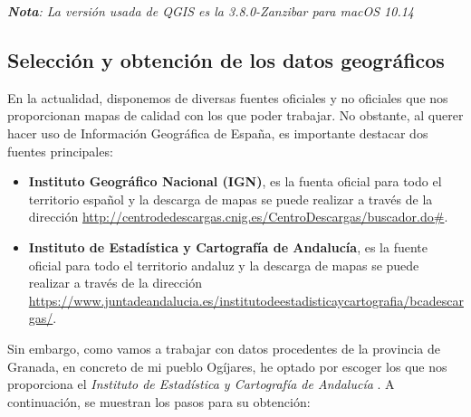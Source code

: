 \textit{\textbf{Nota}: La versión usada de QGIS es la 3.8.0-Zanzibar para macOS 10.14}

\subsection{Selección y obtención de los datos geográficos}

En la actualidad, disponemos de diversas fuentes oficiales y no oficiales que nos proporcionan mapas de calidad con los que poder trabajar. No obstante, al querer hacer uso de Información Geográfica de España, es importante destacar dos fuentes principales:

\begin{itemize}
	\item \textbf{Instituto Geográfico Nacional (IGN)}, es la fuenta oficial para todo el territorio español y la descarga de mapas se puede realizar a través de la dirección \url{http://centrodedescargas.cnig.es/CentroDescargas/buscador.do#}.
	
	\item \textbf{Instituto de Estadística y Cartografía de Andalucía}, es la fuente oficial para todo el territorio andaluz y la descarga de mapas se puede realizar a través de la dirección \url{https://www.juntadeandalucia.es/institutodeestadisticaycartografia/bcadescargas/}.
\end{itemize}
 
Sin embargo, como vamos a trabajar con datos procedentes de la provincia de Granada, en concreto de mi pueblo Ogíjares, he optado por escoger los que nos proporciona el \textit{Instituto de Estadística y Cartografía de Andalucía} \cite{base-andalucia}. A continuación, se muestran los pasos para su obtención:

